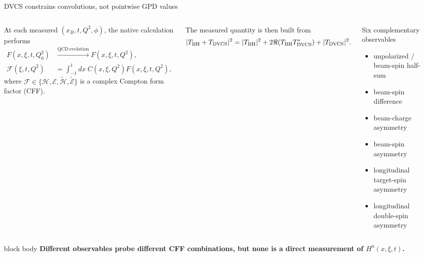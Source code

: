 \documentclass[aspectratio=169,10pt]{beamer}
\newcommand{\takeaway}[1]{%
  \vspace{1mm}\begin{beamercolorbox}[rounded=true,sep=1.4mm,wd=\linewidth]{block body}%
  \centering\color{navy}\bfseries #1
  \end{beamercolorbox}}
\begin{document}
\begin{frame}{DVCS constrains convolutions, not pointwise GPD values}
\begin{columns}[T,onlytextwidth]
At each measured $(x_B,t,Q^2,\phi)$, the native calculation performs
\[
\begin{aligned}
F(x,\xi,t,Q_0^2)&\xrightarrow{\mathrm{QCD\ evolution}}
F(x,\xi,t,Q^2),\\[-1mm]
\mathcal F(\xi,t,Q^2)&=\int_{-1}^{1}dx\;C(x,\xi,Q^2)F(x,\xi,t,Q^2),
\end{aligned}
\]
where $\mathcal F\in\{\mathcal H,\mathcal E,
\widetilde{\mathcal H},\widetilde{\mathcal E}\}$ is a complex Compton form
factor (CFF).

\vspace{2mm}
The measured quantity is then built from
\[
  |T_{\rm BH}+T_{\rm DVCS}|^2
  =|T_{\rm BH}|^2+2\Re(T_{\rm BH}T_{\rm DVCS}^{*})+|T_{\rm DVCS}|^2.
\]

\begin{block}{Six complementary observables}
\small
\begin{itemize}\setlength\itemsep{2mm}
  \item unpolarized / beam-spin half-sum
  \item beam-spin difference
  \item beam-charge asymmetry
  \item beam-spin asymmetry
  \item longitudinal target-spin asymmetry
  \item longitudinal double-spin asymmetry
\end{itemize}
\end{block}
\end{columns}
\takeaway{Different observables probe different CFF combinations, but none is a direct measurement of $H^u(x,\xi,t)$.}
\end{frame}
\end{document}

